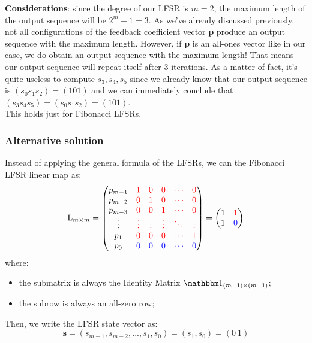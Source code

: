 \textbf{Considerations}: since the degree of our LFSR is $m=2$, the maximum length of the output sequence will be $2^m-1=3$. As we've already discussed previously, not all configurations of the feedback coefficient vector \textbf{p} produce an output sequence with the maximum length. However, if \textbf{p} is an all-ones vector like in our case, we do obtain an output sequence with the maximum length! That means our output sequence will repeat itself after 3 iterations. As a matter of fact, it's quite useless to compute $s_3, s_4, s_5$ since we already know that our output sequence is $(s_0s_1s_2)=(101)$ and we can immediately conclude that $(s_3s_4s_5)=(s_0s_1s_2)=(101)$.\\
This holds just for Fibonacci LFSRs.

\newpage
\subsubsection*{Alternative solution}
Instead of applying the general formula of the LFSRs, we can  the Fibonacci LFSR linear map as:
$$
    \text{L}_{m\times m}=
    \begin{pmatrix}
        p_{m-1} & \textcolor{red}{1} & \textcolor{red}{0} & \textcolor{red}{0} & \textcolor{red}{\cdots} & \textcolor{red}{0}\\
        p_{m-2} & \textcolor{red}{0} & \textcolor{red}{1} & \textcolor{red}{0} & \textcolor{red}{\cdots} & \textcolor{red}{0}\\
        p_{m-3} & \textcolor{red}{0} & \textcolor{red}{0} & \textcolor{red}{1} & \textcolor{red}{\cdots} & \textcolor{red}{0}\\
        \vdots&\textcolor{red}{\vdots}&\textcolor{red}{\vdots}&\textcolor{red}{\vdots}&\textcolor{red}{\ddots}&\textcolor{red}{\vdots}\\
        p_1     & \textcolor{red}{0} & \textcolor{red}{0} & \textcolor{red}{0} & \textcolor{red}{\cdots} & \textcolor{red}{1}\\
        p_0     & \textcolor{blue}{0} & \textcolor{blue}{0} & \textcolor{blue}{0} & \textcolor{blue}{\cdots} & \textcolor{blue}{0}
    \end{pmatrix}
    =
    \begin{pmatrix}
        1 & \textcolor{red}{1}\\
        1 & \textcolor{blue}{0}
    \end{pmatrix}
$$
where:
\begin{itemize}
    \item the  submatrix is always the Identity Matrix $\idMatrix_{(m-1)\times(m-1)}$;
    \item the  subrow is always an all-zero row;
\end{itemize}
Then, we write the LFSR state vector as:
$$\textbf{s}=(s_{m-1},s_{m-2},...,s_1,s_0)=(s_1,s_0)=(0\ 1)$$
